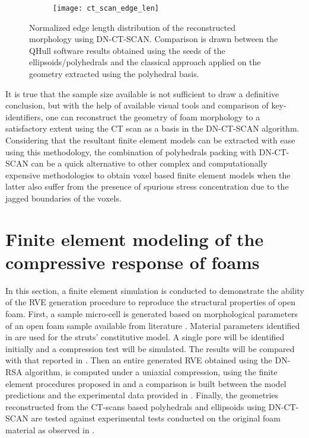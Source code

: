 \begin{figure}
	\centering
	\begin{subfigure}[b]{0.49\textwidth}
		\texttt{[image: ct\_scan\_edge\_len]}
	\end{subfigure}
	\caption{Normalized edge length distribution of the reconstructed morphology using DN-CT-SCAN. Comparison is drawn between the QHull software results obtained using the seeds of the ellipsoids/polyhedrals and the classical approach applied on the geometry extracted using the polyhedral basis.}\label{res-ct-edge}
\end{figure}

It is true that the sample size available is not sufficient to draw a  definitive conclusion, but with the help of available visual tools and comparison of key-identifiers, one can reconstruct the geometry of foam morphology to a satisfactory extent using the CT scan as a basis in the DN-CT-SCAN algorithm. Considering that the resultant finite element models can be extracted with ease using this methodology, the combination of polyhedrals packing with DN-CT-SCAN can be a quick alternative to other complex and computationally expensive methodologies to obtain voxel based finite element models when the latter also suffer from the presence of spurious stress concentration due to the 
jagged boundaries of the voxels. 
\enlargethispage{\baselineskip}

\section{Finite element modeling of the com\-pres\-sive response of foams}\label{res-fem}
In this section, a finite element simulation is conducted to demonstrate the ability of the RVE generation procedure to reproduce the structural properties of open foam. First, a sample micro-cell is generated based on morphological parameters of an open foam sample available from literature \cite{jungMicrostructuralCharacterisationExperimental2017}. Material parameters identified in \cite{heinzeExperimentalNumericalInvestigation2018} are used for the struts' constitutive model. A single pore will be identified initially and a compression test will be simulated. The results will be compared with that reported in \cite{heinzeExperimentalNumericalInvestigation2018}. Then an entire generated RVE obtained using the DN-RSA algorithm, is computed under a uniaxial compression, using the finite element procedures proposed in \cite{nguyenComputationalHomogenizationCellular2014,nguyenUnifiedTreatmentMicroscopic2017} and a comparison is built between the model predictions and the experimental data provided in \cite{jungMicrostructuralCharacterisationExperimental2017}. Finally, the geometries reconstructed from the CT-scans based polyhedrals and ellipsoids using DN-CT-SCAN are tested against experimental tests conducted on the original foam material as observed in \cite{jungMicrostructuralCharacterisationExperimental2017}.

